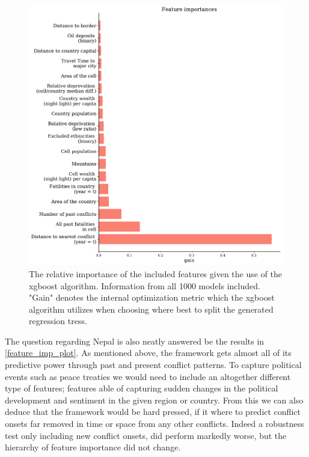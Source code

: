 \documentclass[a4paper]{article}
\begin{document}
\begin{figure}[!htb]
	\centering
	\includegraphics[scale=0.5]{feature_imp.pdf}
    \caption{\footnotesize{The relative importance of the included features given the use of the xgboost algorithm. Information from all 1000 models included. "Gain" denotes the internal optimization metric which the xgboost algorithm utilizes when choosing where best to split the generated regression tress.}}\label{feature_imp_plot}
\end{figure}

The question regarding Nepal is also neatly answered be the results in \autoref{feature_imp_plot}. As mentioned above, the framework gets almost all of its predictive power through past and present conflict patterns. To capture political events such as peace treaties we would need to include an altogether different type of features; features able of capturing sudden changes in the political development and sentiment in the given region or country. From this we can also deduce that the framework would be hard pressed, if it where to predict conflict onsets far removed in time or space from any other conflicts. Indeed a robustness test only including new conflict onsets, did perform markedly worse, but the hierarchy of feature importance did not change.\par
\end{document}
